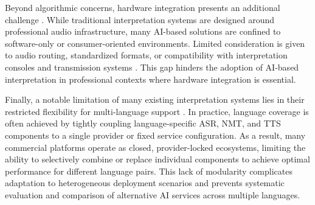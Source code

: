 Beyond algorithmic concerns, hardware integration presents an additional challenge \cite{conference_interpreting_new_tech}. While traditional interpretation systems are designed around professional audio infrastructure, many AI-based solutions are confined to software-only or consumer-oriented environments. Limited consideration is given to audio routing, standardized formats, or compatibility with interpretation consoles and transmission systems \cite{conference_interpreting_new_tech}. This gap hinders the adoption of AI-based interpretation in professional contexts where hardware integration is essential.

Finally, a notable limitation of many existing interpretation systems lies in their restricted flexibility for multi-language support \cite{weller2021streamingST, popescu-belis2025s2spipelines }. In practice, language coverage is often achieved by tightly coupling language-specific ASR, NMT, and TTS components to a single provider or fixed service configuration. As a result, many commercial platforms operate as closed, provider-locked ecosystems, limiting the ability to selectively combine or replace individual components to achieve optimal performance for different language pairs. This lack of modularity complicates adaptation to heterogeneous deployment scenarios and prevents systematic evaluation and comparison of alternative AI services across multiple languages.


